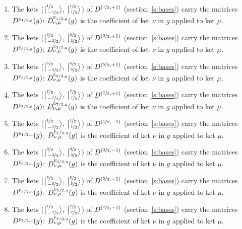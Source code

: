 \documentclass[10pt,a4paper]{article}
\numberwithin{equation}{section}
\newcommand{\irr}[1]{\text{\normalfont\scshape #1}}
\newcommand{\ptag}[1]{\mathrm{#1}}
\newcommand{\irrJp}[2]{D^{(#1,#2)}}
\newcommand{\repD}[1]{D^{#1}}
\newcommand{\intx}{\mu}
\newcommand{\jm}[2]{\bigl\lvert{}^{#1}_{\,#2}\bigr\rangle}
\newenvironment{romanlist}{\begin{enumerate}%
\renewcommand{\labelenumi}{(\roman{enumi})}}%
  {\end{enumerate}}
\begin{document}
\begin{romanlist}\raggedright
\item The kets ($\jm{\nicefrac{1}{2}}{-\nicefrac{1}{2}}$, $\jm{\nicefrac{1}{2}}{\nicefrac{1}{2}}$) of $\irrJp{\nicefrac{1}{2}}{+1}$ (section~\ref{s:bases}) carry the matrices $\repD{\irr{e}_{1/2,\ptag{g}}}(g)$: $\repD{\irr{e}_{1/2,\ptag{g}}}_{\nu,\intx}(g)$ is the coefficient of ket $\nu$ in $g$ applied to ket $\intx$.
\item The kets ($\jm{\nicefrac{3}{2}}{-\nicefrac{3}{2}}$, $\jm{\nicefrac{3}{2}}{\nicefrac{3}{2}}$) of $\irrJp{\nicefrac{3}{2}}{+1}$ (section~\ref{s:bases}) carry the matrices $\repD{\irr{e}_{3/2,\ptag{g}}}(g)$: $\repD{\irr{e}_{3/2,\ptag{g}}}_{\nu,\intx}(g)$ is the coefficient of ket $\nu$ in $g$ applied to ket $\intx$.
\item The kets ($\jm{\nicefrac{5}{2}}{-\nicefrac{5}{2}}$, $\jm{\nicefrac{5}{2}}{\nicefrac{5}{2}}$) of $\irrJp{\nicefrac{5}{2}}{+1}$ (section~\ref{s:bases}) carry the matrices $\repD{\irr{e}_{5/2,\ptag{g}}}(g)$: $\repD{\irr{e}_{5/2,\ptag{g}}}_{\nu,\intx}(g)$ is the coefficient of ket $\nu$ in $g$ applied to ket $\intx$.
\item The kets ($\jm{\nicefrac{7}{2}}{-\nicefrac{7}{2}}$, $\jm{\nicefrac{7}{2}}{\nicefrac{7}{2}}$) of $\irrJp{\nicefrac{7}{2}}{+1}$ (section~\ref{s:bases}) carry the matrices $\repD{\irr{e}_{7/2,\ptag{g}}}(g)$: $\repD{\irr{e}_{7/2,\ptag{g}}}_{\nu,\intx}(g)$ is the coefficient of ket $\nu$ in $g$ applied to ket $\intx$.
\item The kets ($\jm{\nicefrac{1}{2}}{-\nicefrac{1}{2}}$, $\jm{\nicefrac{1}{2}}{\nicefrac{1}{2}}$) of $\irrJp{\nicefrac{1}{2}}{-1}$ (section~\ref{s:bases}) carry the matrices $\repD{\irr{e}_{1/2,\ptag{u}}}(g)$: $\repD{\irr{e}_{1/2,\ptag{u}}}_{\nu,\intx}(g)$ is the coefficient of ket $\nu$ in $g$ applied to ket $\intx$.
\item The kets ($\jm{\nicefrac{3}{2}}{-\nicefrac{3}{2}}$, $\jm{\nicefrac{3}{2}}{\nicefrac{3}{2}}$) of $\irrJp{\nicefrac{3}{2}}{-1}$ (section~\ref{s:bases}) carry the matrices $\repD{\irr{e}_{3/2,\ptag{u}}}(g)$: $\repD{\irr{e}_{3/2,\ptag{u}}}_{\nu,\intx}(g)$ is the coefficient of ket $\nu$ in $g$ applied to ket $\intx$.
\item The kets ($\jm{\nicefrac{5}{2}}{-\nicefrac{5}{2}}$, $\jm{\nicefrac{5}{2}}{\nicefrac{5}{2}}$) of $\irrJp{\nicefrac{5}{2}}{-1}$ (section~\ref{s:bases}) carry the matrices $\repD{\irr{e}_{5/2,\ptag{u}}}(g)$: $\repD{\irr{e}_{5/2,\ptag{u}}}_{\nu,\intx}(g)$ is the coefficient of ket $\nu$ in $g$ applied to ket $\intx$.
\item The kets ($\jm{\nicefrac{7}{2}}{-\nicefrac{7}{2}}$, $\jm{\nicefrac{7}{2}}{\nicefrac{7}{2}}$) of $\irrJp{\nicefrac{7}{2}}{-1}$ (section~\ref{s:bases}) carry the matrices $\repD{\irr{e}_{7/2,\ptag{u}}}(g)$: $\repD{\irr{e}_{7/2,\ptag{u}}}_{\nu,\intx}(g)$ is the coefficient of ket $\nu$ in $g$ applied to ket $\intx$.
\end{romanlist}
\end{document}
